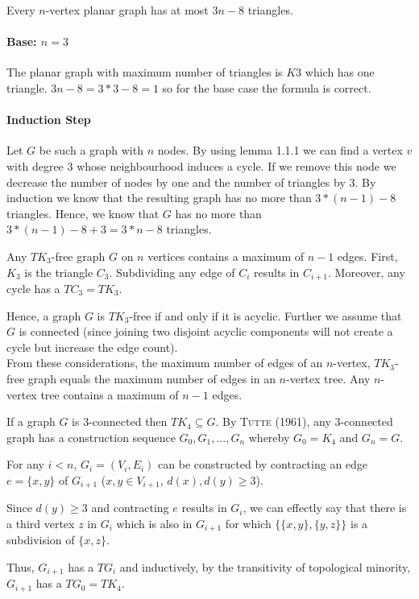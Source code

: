 \documentclass[a4paper]{article}
\begin{document}
\begin{solution}{21}
\begin{theorem}{Every $n$-vertex planar graph has at most $3n-8$ triangles.}
		\paragraph{Base: $n=3$}
		The planar graph with maximum number of triangles is $K3$ which has one triangle. 
		$3n-8 = 3*3-8 = 1$ so for the base case the formula is correct.  
		\paragraph{Induction Step}
		Let $G$ be such a graph with $n$ nodes. 
		By using lemma 1.1.1 we can find a vertex $v$ with degree 3 whose neighbourhood induces a cycle.
		If we remove this node we decrease the number of nodes by one and the number of triangles by 3. 
		By induction we know that the resulting graph has no more than $3*(n-1) -8$ triangles. 
		Hence, we know that $G$ has no more than $3*(n-1) -8 + 3 = 3*n-8$ triangles. 
		\end{theorem}
	\end{solution}
	\newpage
	\begin{solution}{22}
		\begin{theorem}{Any $TK_3$-free graph $G$ on $n$ vertices contains a maximum of $n-1$ edges.}
			First, $K_3$ is the triangle $C_3$. Subdividing any edge of $C_i$ results in $C_{i+1}$. Moreover, any cycle has a $TC_3 = TK_3$.
			
			Hence, a graph $G$ is $TK_3$-free if and only if it is acyclic. Further we assume that $G$ is connected (since joining two disjoint acyclic components will not create a cycle but increase the edge count).\\

			From these considerations, the maximum number of edges of an $n$-vertex, $TK_3$-free graph equals the maximum number of edges in an $n$-vertex tree. Any $n$-vertex tree contains a maximum of $n - 1$ edges.
		\end{theorem}

		\begin{theorem}{If a graph $G$ is $3$-connected then $TK_4 \subseteq G$.}
			By \textsc{Tutte (1961)}, any $3$-connected graph has a construction sequence $G_0, G_1, ..., G_n$ whereby $G_0 = K_4$ and $G_n = G$.

			For any $i < n$, $G_i = (V_i, E_i)$ can be constructed by contracting an edge $e = \{x, y\}$ of $G_{i+1}$ ($x, y \in V_{i+1}$, $d(x), d(y) \geq 3$).

			Since $d(y) \geq 3$ and contracting $e$ results in $G_i$, we can effectly say that there is a third vertex $z$ in $G_i$ which is also in $G_{i+1}$ for which $\{\{x,y\}, \{y, z\}\}$ is a subdivision of $\{x,z\}$.

			Thus, $G_{i+1}$ has a $TG_{i}$ and inductively, by the transitivity of topological minority, $G_{i+1}$ has a $TG_0 = TK_4$.
		\end{theorem}
	\end{solution}
	
\end{document}
